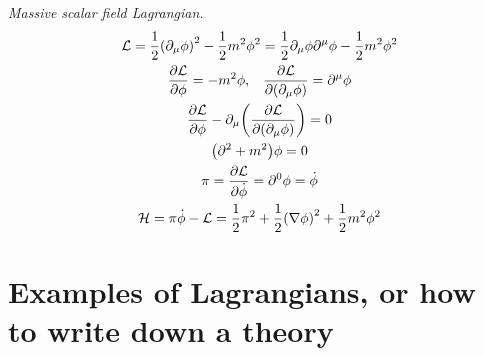 \documentclass{report}
\begin{document}
\begin{subquests}
	\item \emph{Massive scalar field Lagrangian.}
	\begin{gather*}
		\mathcal L = \frac{1}{2}\pqty{\partial_{\mu}\phi}^2 - \frac{1}{2}m^2\phi^2  = \frac{1}{2}\partial_{\mu}\phi\partial^{\mu}\phi - \frac{1}{2}m^2\phi^2 \\
		\pdv{\mathcal L}{\phi} = -m^2\phi, \;\;\; \pdv{\mathcal L}{\pqty{\partial_{\mu}\phi}} = \partial^{\mu}\phi \\
		\pdv{\mathcal L}{\phi}-\partial_{\mu}\pqty{\pdv{\mathcal L}{\pqty{\partial_{\mu}\phi}}} = 0 \\
		\pqty{\partial^2 + m^2}\phi = 0 \\
		\pi = \pdv{\mathcal L}{\dot{\phi}} = \partial^0 \phi = \dot{\phi} \\
		\mathcal H = \pi\dot{\phi} - \mathcal L = \frac{1}{2}\pi^2 + \frac{1}{2}\pqty{\nabla{\phi}}^2 + \frac{1}{2}m^2\phi^2 \\
	\end{gather*}
\end{subquests}

\chapter{Examples of Lagrangians, or how to write down a theory}
\end{document}
